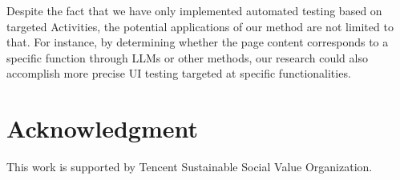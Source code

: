 \documentclass[conference]{IEEEtran}
\begin{document}
Despite the fact that we have only implemented automated testing based on targeted Activities, the potential applications of our method are not limited to that. For instance, by determining whether the page content corresponds to a specific function through LLMs or other methods, our research could also accomplish more precise UI testing targeted at specific functionalities.

\section*{Acknowledgment}

This work is supported by Tencent Sustainable Social Value Organization.
\printbibliography

\end{document}
